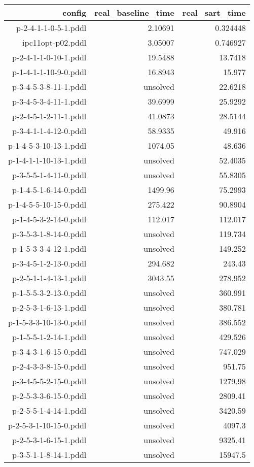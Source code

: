 \documentclass{article}
\begin{document}
                            \begin{center}
                            \scriptsize
                            \begin{tabular}{r|r|r}
                            config & real\_baseline\_time & real\_sart\_time\\\midrule
                             p-2-4-1-1-0-5-1.pddl&2.10691&0.324448\\
 ipc11opt-p02.pddl&3.05007&0.746927\\
 p-2-4-1-1-0-10-1.pddl&19.5488&13.7418\\
 p-1-4-1-1-10-9-0.pddl&16.8943&15.977\\
 p-3-4-5-3-8-11-1.pddl&unsolved&22.6218\\
 p-3-4-5-3-4-11-1.pddl&39.6999&25.9292\\
 p-2-4-5-1-2-11-1.pddl&41.0873&28.5144\\
 p-3-4-1-1-4-12-0.pddl&58.9335&49.916\\
 p-1-4-5-3-10-13-1.pddl&1074.05&48.636\\
 p-1-4-1-1-10-13-1.pddl&unsolved&52.4035\\
 p-3-5-5-1-4-11-0.pddl&unsolved&55.8305\\
 p-1-4-5-1-6-14-0.pddl&1499.96&75.2993\\
 p-1-4-5-5-10-15-0.pddl&275.422&90.8904\\
 p-1-4-5-3-2-14-0.pddl&112.017&112.017\\
 p-3-5-3-1-8-14-0.pddl&unsolved&119.734\\
 p-1-5-3-3-4-12-1.pddl&unsolved&149.252\\
 p-3-4-5-1-2-13-0.pddl&294.682&243.43\\
 p-2-5-1-1-4-13-1.pddl&3043.55&278.952\\
 p-1-5-5-3-2-13-0.pddl&unsolved&360.991\\
 p-2-5-3-1-6-13-1.pddl&unsolved&380.781\\
 p-1-5-3-3-10-13-0.pddl&unsolved&386.552\\
 p-1-5-5-1-2-14-1.pddl&unsolved&429.526\\
 p-3-4-3-1-6-15-0.pddl&unsolved&747.029\\
 p-2-4-3-3-8-15-0.pddl&unsolved&951.75\\
 p-3-4-5-5-2-15-0.pddl&unsolved&1279.98\\
 p-2-5-3-3-6-15-0.pddl&unsolved&2809.41\\
 p-2-5-5-1-4-14-1.pddl&unsolved&3420.59\\
 p-2-5-3-1-10-15-0.pddl&unsolved&4097.3\\
 p-2-5-3-1-6-15-1.pddl&unsolved&9325.41\\
 p-3-5-1-1-8-14-1.pddl&unsolved&15947.5
                            \end{tabular}
                            \end{center}
                    
                
\end{document}
